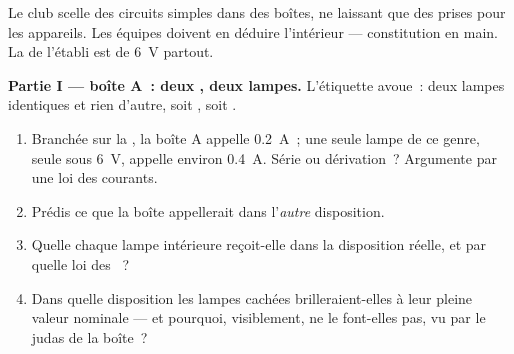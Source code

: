 \begin{problem}\label{pb:g8:circuit-laws:1}
Le club scelle des circuits simples dans des boîtes, ne laissant que
des prises pour les appareils. Les équipes doivent en déduire
l'intérieur --- constitution en main. La  de l'établi est de
\qty{6}{V} partout.

\medskip\noindent\textbf{Partie I --- boîte A~: deux , deux
lampes.}
L'étiquette avoue~: deux lampes identiques et rien d'autre, soit , soit .
\begin{enumerate}
  \item Branchée sur la , la boîte A appelle \qty{0.2}{A}~; une
        seule lampe de ce genre, seule sous \qty{6}{V}, appelle
        environ \qty{0.4}{A}. Série ou dérivation~? Argumente par
        une loi des courants.
  \item Prédis ce que la boîte appellerait dans l'\emph{autre}
        disposition.
  \item Quelle  chaque lampe intérieure reçoit-elle dans la
        disposition réelle, et par quelle loi des ~?
  \item Dans quelle disposition les lampes cachées brilleraient-elles
        à leur pleine valeur nominale --- et pourquoi, visiblement,
        ne le font-elles pas, vu par le judas de la boîte~?
\end{enumerate}


\end{problem}
